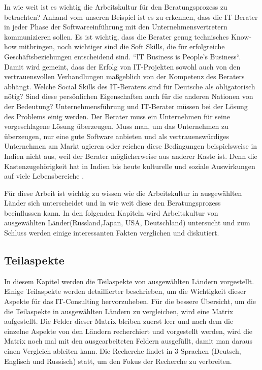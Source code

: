 	In wie weit ist es wichtig die Arbeitskultur für den Beratungsprozess zu betrachten? Anhand vom unseren Beispiel ist es zu erkennen, dass die IT-Berater in jeder Phase der Softwareeinführung mit den Unternehmensvertretern kommunizieren sollen. Es ist wichtig, dass die Berater genug technisches Know-how mitbringen, noch wichtiger sind die Soft Skills, die für erfolgreiche Geschäftsbeziehungen entscheidend sind. ``IT Business is People's Business``. Damit wird gemeint, dass der Erfolg von   IT-Projekten sowohl auch von den vertrauensvollen Verhandlungen maßgeblich von der Kompetenz des Beraters abhängt. \cite{ITConsRu}
	Welche Social Skills des IT-Beraters sind für Deutsche als obligatorisch nötig? Sind diese persönlichen Eigenschaften auch für die anderen Nationen von der Bedeutung? Unternehmensführung und IT-Berater müssen bei der Lösung des Problems einig werden. Der Berater muss ein Unternehmen für seine vorgeschlagene Lösung überzeugen. Muss man, um das Unternehmen zu überzeugen, nur eine gute Software anbieten und als vertrauenswürdiges Unternehmen am Markt agieren oder reichen diese Bedingungen beispielsweise in Indien nicht aus, weil der Berater möglicherweise aus anderer Kaste ist. Denn die Kastenzugehörigkeit hat in Indien bis heute kulturelle und soziale Auswirkungen auf viele Lebensbereiche \cite{KastensystemInd}.

	Für diese Arbeit ist wichtig zu wissen wie die Arbeitskultur in ausgewählten Länder sich unterscheidet und in wie weit diese den Beratungsprozess beeinflussen kann.
	In den folgenden Kapiteln wird Arbeitskultur von ausgewählten Länder(Russland,Japan, USA, Deutschland) untersucht und zum Schluss werden einige interessanten Fakten verglichen und diskutiert. 
\subsection{Teilaspekte}
	In diesem Kapitel werden die Teilaspekte von ausgewählten Ländern vorgestellt. Einige Teilaspekte werden detaillierter beschrieben, um die Wichtigkeit dieser Aspekte für das IT-Consulting hervorzuheben. Für die bessere Übersicht, um die die Teilaspekte in ausgewählten Ländern zu vergleichen, wird eine Matrix aufgestellt. Die Felder dieser Matrix bleiben zuerst leer und nach dem die einzelne Aspekte von den Ländern recherchiert und vorgestellt werden, wird die Matrix noch mal mit den ausgearbeiteten Feldern ausgefüllt, damit man daraus einen Vergleich ableiten kann. Die Recherche findet in 3 Sprachen (Deutsch, Englisch und Russisch) statt, um den Fokus der Recherche zu verbreiten.
	
